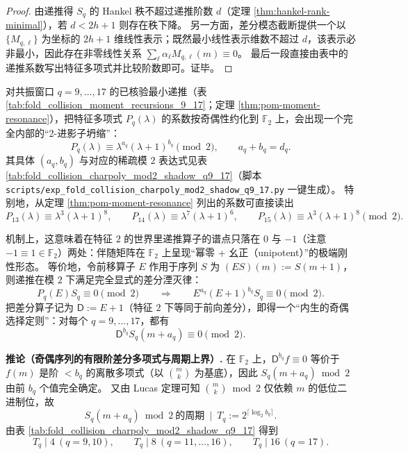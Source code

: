 \begin{proof}
由递推得 \(S_q\) 的 Hankel 秩不超过递推阶数 \(d\)（定理 \ref{thm:hankel-rank-minimal}），若 \(d<2h+1\) 则存在秩下降。
另一方面，差分模态截断提供一个以 \(\{M_{q,\ell}\}\) 为坐标的 \(2h+1\) 维线性表示；既然最小线性表示维数不超过 \(d\)，该表示必非最小，因此存在非零线性关系 \(\sum_{\ell}\alpha_\ell M_{q,\ell}(m)\equiv 0\)。
最后一段直接由表中的递推系数写出特征多项式并比较阶数即可。证毕。
\end{proof}



\begin{remark}\label{rem:pom-charpoly-mod2-shadow}
对共振窗口 \(q=9,\dots,17\) 的已核验最小递推（表 \ref{tab:fold_collision_moment_recursions_9_17}；定理 \ref{thm:pom-moment-resonance}），把特征多项式 \(P_q(\lambda)\) 的系数按奇偶性约化到 \(\mathbb{F}_2\) 上，会出现一个完全内部的“2-进影子坍缩”：
\[
P_q(\lambda)\equiv \lambda^{a_q}(\lambda+1)^{b_q}\pmod 2,
\qquad a_q+b_q=d_q.
\]
其具体 \((a_q,b_q)\) 与对应的稀疏模 \(2\) 表达式见表 \ref{tab:fold_collision_charpoly_mod2_shadow_q9_17}（脚本 \texttt{scripts/exp\_fold\_collision\_charpoly\_mod2\_shadow\_q9\_17.py} 一键生成）。
特别地，从定理 \ref{thm:pom-moment-resonance} 列出的系数可直接读出
\[
P_{13}(\lambda)\equiv \lambda^3(\lambda+1)^8,\qquad
P_{14}(\lambda)\equiv \lambda^7(\lambda+1)^6,\qquad
P_{15}(\lambda)\equiv \lambda^3(\lambda+1)^8\pmod 2.
\]
\par
机制上，这意味着在特征 \(2\) 的世界里递推算子的谱点只落在 \(0\) 与 \(-1\)（注意 \(-1\equiv 1\in\mathbb{F}_2\)）两处：伴随矩阵在 \(\mathbb{F}_2\) 上呈现“幂零 + 幺正（unipotent）”的极端刚性形态。
等价地，令前移算子 \(E\) 作用于序列 \(S\) 为 \((ES)(m):=S(m+1)\)，则递推在模 \(2\) 下满足完全显式的差分湮灭律：
\[
P_q(E)S_q\equiv 0\pmod 2
\qquad\Longrightarrow\qquad
E^{a_q}(E+1)^{b_q}S_q\equiv 0\pmod 2.
\]
把差分算子记为 \(\mathsf{D}:=E+1\)（特征 \(2\) 下等同于前向差分），即得一个“内生的奇偶选择定则”：对每个 \(q=9,\dots,17\)，都有
\[
\mathsf{D}^{b_q}S_q(m+a_q)\equiv 0\pmod 2.
\]
\par
\textbf{推论（奇偶序列的有限阶差分多项式与周期上界）.}
在 \(\mathbb{F}_2\) 上，\(\mathsf{D}^{b_q}f\equiv 0\) 等价于 \(f(m)\) 是阶 \(<b_q\) 的离散多项式（以 \(\binom{m}{k}\) 为基底），因此 \(S_q(m+a_q)\bmod 2\) 由前 \(b_q\) 个值完全确定。
又由 Lucas 定理可知 \(\binom{m}{k}\bmod 2\) 仅依赖 \(m\) 的低位二进制位，故
\[
S_q(m+a_q)\bmod 2\ \text{的周期}\ \mid\ T_q:=2^{\lceil\log_2 b_q\rceil}.
\]
由表 \ref{tab:fold_collision_charpoly_mod2_shadow_q9_17} 得到
\[
T_q\mid 4\ (q=9,10),\qquad
T_q\mid 8\ (q=11,\dots,16),\qquad
T_q\mid 16\ (q=17).
\]
\end{remark}

